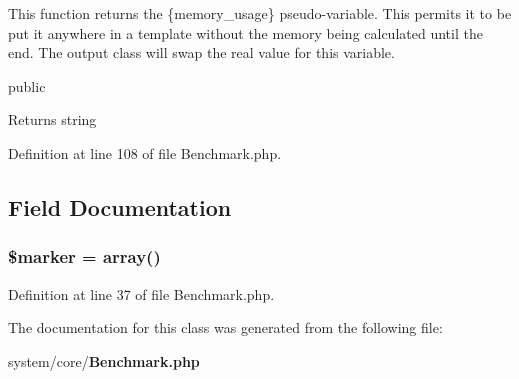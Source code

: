 This function returns the \{memory\-\_\-usage\} pseudo-\/variable. This permits it to be put it anywhere in a template without the memory being calculated until the end. The output class will swap the real value for this variable.

public \begin{DoxyReturn}{Returns}
string 
\end{DoxyReturn}


Definition at line 108 of file Benchmark.\-php.



\subsection{Field Documentation}
\subsubsection[{\$marker}]{\setlength{\rightskip}{0pt plus 5cm}\$marker = array()}\label{class_c_i___benchmark_aad34fbf53cda6bd8a3a9c46764d534fa}


Definition at line 37 of file Benchmark.\-php.



The documentation for this class was generated from the following file\-:\begin{DoxyCompactItemize}
\item 
system/core/{\bf Benchmark.\-php}\end{DoxyCompactItemize}
